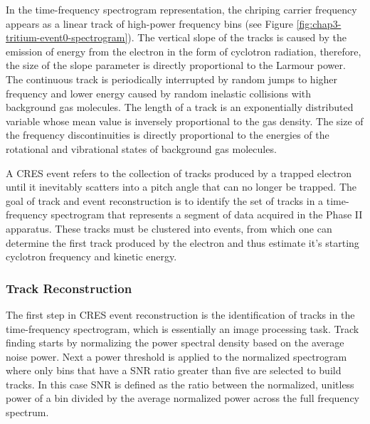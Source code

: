 In the time-frequency spectrogram representation, the chriping carrier frequency appears as a linear track of high-power frequency bins (see Figure \ref{fig:chap3-tritium-event0-spectrogram}). The vertical slope of the tracks is caused by the emission of energy from the electron in the form of cyclotron radiation, therefore, the size of the slope parameter is directly proportional to the Larmour power. The continuous track is periodically interrupted by random jumps to higher frequency and lower energy caused by random inelastic collisions with background gas molecules. The length of a track is an exponentially distributed variable whose mean value is inversely proportional to the gas density. The size of the frequency discontinuities is directly proportional to the energies of the rotational and vibrational states of background gas molecules. 

A CRES event refers to the collection of tracks produced by a trapped electron until it inevitably scatters into a pitch angle that can no longer be trapped. The goal of track and event reconstruction is to identify the set of tracks in a time-frequency spectrogram that represents a segment of data acquired in the Phase II apparatus. These tracks must be clustered into events, from which one can determine the first track produced by the electron and thus estimate it's starting cyclotron frequency and kinetic energy. 

\subsubsection*{Track Reconstruction}

The first step in CRES event reconstruction is the identification of tracks in the time-frequency spectrogram, which is essentially an image processing task. Track finding starts by normalizing the power spectral density based on the average noise power. Next a power threshold is applied to the normalized spectrogram where only bins that have a SNR ratio greater than five are selected to build tracks. In this case SNR is defined as the ratio between the normalized, unitless power of a bin divided by the average normalized power across the full frequency spectrum.

